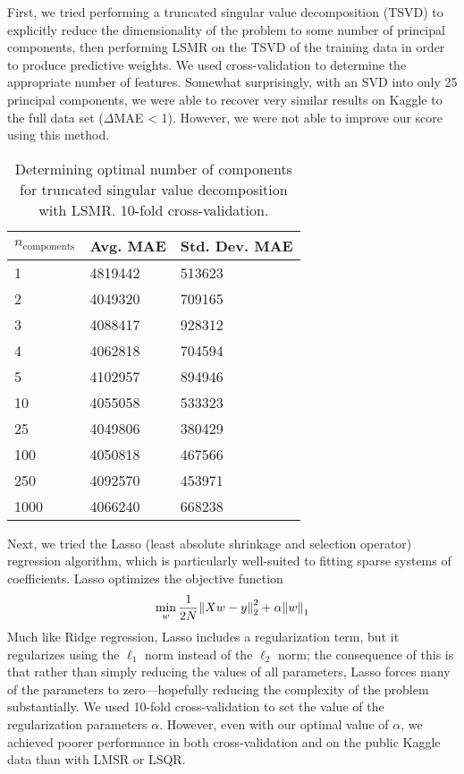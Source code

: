 \documentclass[11pt]{amsart}
\begin{document}
First, we tried performing a truncated singular value decomposition (TSVD) to explicitly reduce the dimensionality of the problem to some number of principal components, then performing LSMR on the TSVD of the training data in order to produce predictive weights. We used cross-validation to determine the appropriate number of features. Somewhat surprisingly, with an SVD into only 25 principal components, we were able to recover very similar results on Kaggle to the full data set ($\Delta$MAE < 1). However, we were not able to improve our score using this method.

\begin{table}[h]
\begin{tabular}{@{}lll@{}}
\toprule
$n_\text{components}$ & Avg. MAE & Std. Dev. MAE \\ \midrule
1             & 4819442  & 513623        \\
2             & 4049320  & 709165        \\
3             & 4088417  & 928312        \\
4             & 4062818  & 704594        \\
5             & 4102957  & 894946        \\
10            & 4055058  & 533323        \\
25            & 4049806  & 380429        \\
100           & 4050818  & 467566        \\
250           & 4092570  & 453971        \\
1000          & 4066240  & 668238        \\ \bottomrule
\end{tabular}
\caption{Determining optimal number of components for truncated singular value decomposition with LSMR. 10-fold cross-validation.}
\end{table}

Next, we tried the Lasso (least absolute shrinkage and selection operator) regression algorithm, which is particularly well-suited to fitting sparse systems of coefficients. Lasso optimizes the objective function
$$\min_w \frac{1}{2 N} \norm{X w - y}_2^2 + \alpha \norm{w}_1$$
Much like Ridge regression, Lasso includes a regularization term, but it regularizes using the $\ell_1$ norm instead of the $\ell_2$ norm; the consequence of this is that rather than simply reducing the values of all parameters, Lasso forces many of the parameters to zero---hopefully reducing the complexity of the problem substantially. We used 10-fold cross-validation to set the value of the regularization parameters $\alpha$. However, even with our optimal value of $\alpha$, we achieved poorer performance in both cross-validation and on the public Kaggle data than with LMSR or LSQR. 
\end{document}
